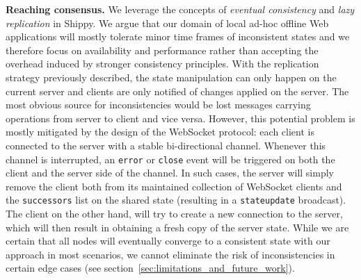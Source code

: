 \textbf{Reaching consensus.}
We leverage the concepts of \textit{eventual consistency} and \textit{lazy replication} in Shippy.
We argue that our domain of local ad-hoc offline Web applications will mostly tolerate minor time frames of inconsistent states and we therefore focus on availability and performance rather than accepting the overhead induced by stronger consistency principles.
With the replication strategy previously described, the state manipulation can only happen on the current server and clients are only notified of changes applied on the server.
The most obvious source for inconsistencies would be lost messages carrying operations from server to client and vice versa.
However, this potential problem is mostly mitigated by the design of the WebSocket protocol: each client is connected to the server with a stable bi-directional channel. 
Whenever this channel is interrupted, an \texttt{error} or \texttt{close} event will be triggered on both the client and the server side of the channel.
In such cases, the server will simply remove the client both from its maintained collection of WebSocket clients and the \texttt{successors} list on the shared state (resulting in a \texttt{stateupdate} broadcast). 
The client on the other hand, will try to create a new connection to the server, which will then result in obtaining a fresh copy of the server state.
While we are certain that all nodes will eventually converge to a consistent state with our approach in most scenarios, we cannot eliminate the risk of inconsistencies in certain edge cases (see section~\ref{sec:limitations_and_future_work}).